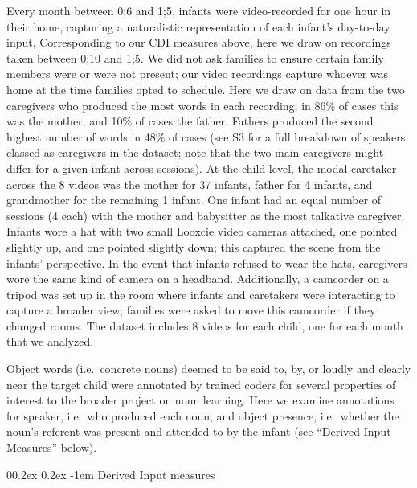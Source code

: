 \documentclass[
  man,floatsintext]{apa6}
\makeatletter
\let\oldparagraph\paragraph
\renewcommand{\paragraph}[1]{\oldparagraph{#1}\mbox{}}
\renewcommand{\paragraph}{\@startsection{paragraph}{4}{\parindent}%
  {0\baselineskip \@plus 0.2ex \@minus 0.2ex}%
  {-1em}%
  {\normalfont\normalsize\bfseries\itshape\typesectitle}}
\makeatother
\begin{document}
Every month between 0;6 and 1;5, infants were video-recorded for one hour in their home, capturing a naturalistic representation of each infant's day-to-day input. Corresponding to our CDI measures above, here we draw on recordings taken between 0;10 and 1;5. We did not ask families to ensure certain family members were or were not present; our video recordings capture whoever was home at the time families opted to schedule. Here we draw on data from the two caregivers who produced the most words in each recording; in 86\% of cases this was the mother, and 10\% of cases the father. Fathers produced the second highest number of words in 48\% of cases (see S3 for a full breakdown of speakers classed as caregivers in the dataset; note that the two main caregivers might differ for a given infant across sessions). At the child level, the modal caretaker across the 8 videos was the mother for 37 infants, father for 4 infants, and grandmother for the remaining 1 infant. One infant had an equal number of sessions (4 each) with the mother and babysitter as the most talkative caregiver. Infants wore a hat with two small Looxcie video cameras attached, one pointed slightly up, and one pointed slightly down; this captured the scene from the infants' perspective. In the event that infants refused to wear the hats, caregivers wore the same kind of camera on a headband. Additionally, a camcorder on a tripod was set up in the room where infants and caretakers were interacting to capture a broader view; families were asked to move this camcorder if they changed rooms. The dataset includes 8 videos for each child, one for each month that we analyzed.

Object words (i.e.~concrete nouns) deemed to be said to, by, or loudly and clearly near the target child were annotated by trained coders for several properties of interest to the broader project on noun learning. Here we examine annotations for speaker, i.e.~who produced each noun, and object presence, i.e.~whether the noun's referent was present and attended to by the infant (see ``Derived Input Measures'' below).

\hypertarget{derived-input-measures}{%
\paragraph{Derived Input measures}\label{derived-input-measures}}
\end{document}
